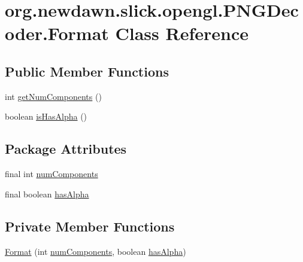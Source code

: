 \hypertarget{classorg_1_1newdawn_1_1slick_1_1opengl_1_1_p_n_g_decoder_1_1_format}{}\section{org.\+newdawn.\+slick.\+opengl.\+P\+N\+G\+Decoder.\+Format Class Reference}
\label{classorg_1_1newdawn_1_1slick_1_1opengl_1_1_p_n_g_decoder_1_1_format}
\subsection*{Public Member Functions}
\begin{DoxyCompactItemize}
\item 
int \mbox{\hyperlink{classorg_1_1newdawn_1_1slick_1_1opengl_1_1_p_n_g_decoder_1_1_format_a9a6a9832fa794ee57921dddb4220e8b5}{get\+Num\+Components}} ()
\item 
boolean \mbox{\hyperlink{classorg_1_1newdawn_1_1slick_1_1opengl_1_1_p_n_g_decoder_1_1_format_a2ee85b336bf274f2e260643ccfacd7bb}{is\+Has\+Alpha}} ()
\end{DoxyCompactItemize}
\subsection*{Package Attributes}
\begin{DoxyCompactItemize}
\item 
final int \mbox{\hyperlink{classorg_1_1newdawn_1_1slick_1_1opengl_1_1_p_n_g_decoder_1_1_format_a5341873553cbc62b97c74e2bddea56d3}{num\+Components}}
\item 
final boolean \mbox{\hyperlink{classorg_1_1newdawn_1_1slick_1_1opengl_1_1_p_n_g_decoder_1_1_format_a63e22f1217dc807077929d895fea4182}{has\+Alpha}}
\end{DoxyCompactItemize}
\subsection*{Private Member Functions}
\begin{DoxyCompactItemize}
\item 
\mbox{\hyperlink{classorg_1_1newdawn_1_1slick_1_1opengl_1_1_p_n_g_decoder_1_1_format_a7ed7ee6686890e5e24465871be7516e3}{Format}} (int \mbox{\hyperlink{classorg_1_1newdawn_1_1slick_1_1opengl_1_1_p_n_g_decoder_1_1_format_a5341873553cbc62b97c74e2bddea56d3}{num\+Components}}, boolean \mbox{\hyperlink{classorg_1_1newdawn_1_1slick_1_1opengl_1_1_p_n_g_decoder_1_1_format_a63e22f1217dc807077929d895fea4182}{has\+Alpha}})
\end{DoxyCompactItemize}



